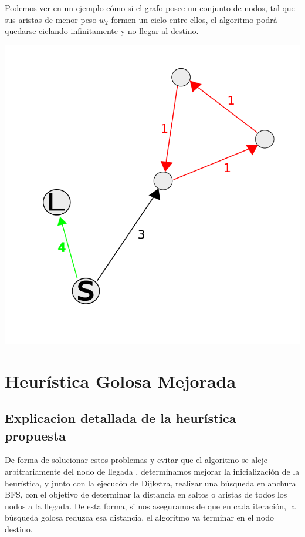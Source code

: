 Podemos ver en un ejemplo c\'omo si el grafo posee un conjunto de nodos, tal que sus aristas de menor peso $w_2$ formen un ciclo entre ellos, el algoritmo podr\'a quedarse ciclando infinitamente y no llegar al destino.

\begin{center}
\includegraphics[scale=0.35]{img/ciclo.png}
\end{center}


\section{Heur\'istica Golosa Mejorada}

\subsection{Explicacion detallada de la heur\'istica propuesta}

De forma de solucionar estos problemas y evitar que el algoritmo se aleje arbitrariamente del nodo de llegada , determinamos mejorar la inicializaci\'on de la heur\'istica, y junto con la ejecuc\'on de Dijkstra, realizar una b\'usqueda en anchura BFS, con el objetivo de determinar la distancia en saltos o aristas de todos los nodos a la llegada. De esta forma, si nos aseguramos de que en cada iteraci\'on, la b\'usqueda golosa reduzca esa distancia, el algoritmo va terminar en el nodo destino.


